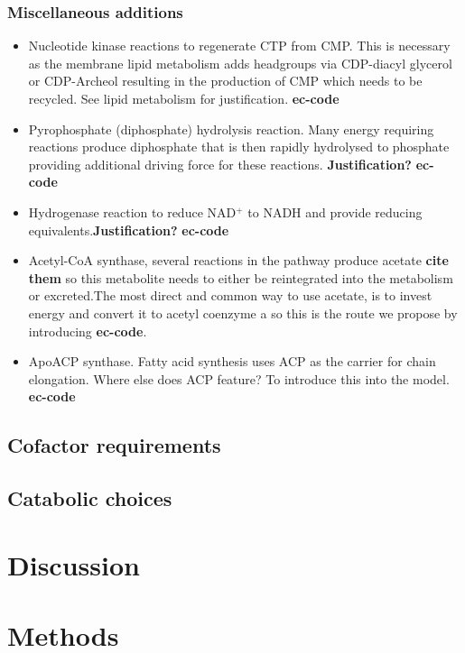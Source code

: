 \documentclass[10pt]{article}
\begin{document}
\subsubsection*{Miscellaneous additions}
\begin{itemize}
 \item Nucleotide kinase reactions to regenerate CTP from CMP. This is necessary as the membrane lipid metabolism adds headgroups via CDP-diacyl glycerol or CDP-Archeol resulting in the production of CMP which needs to be recycled. See lipid metabolism for justification. \textbf{ec-code}
 \item Pyrophosphate (diphosphate) hydrolysis reaction. Many energy requiring reactions produce diphosphate that is then rapidly hydrolysed to phosphate providing additional driving force for these reactions. \textbf{Justification?} \textbf{ec-code}
 \item Hydrogenase reaction to reduce NAD$^+$ to NADH and provide reducing equivalents.\textbf{Justification?} \textbf{ec-code}
 \item Acetyl-CoA synthase, several reactions in the pathway produce acetate \textbf{cite them} so this metabolite needs to either be reintegrated into the metabolism or excreted.The most direct and common way to use acetate, is to invest energy and convert it to acetyl coenzyme a so this is the route we propose by introducing \textbf{ec-code}.
 \item ApoACP synthase. Fatty acid synthesis uses ACP as the carrier for chain elongation. Where else does ACP feature? To introduce this into the model. \textbf{ec-code}
\end{itemize}

\subsection*{Cofactor requirements}
\subsection*{Catabolic choices}
\section*{Discussion}
\section*{Methods}
\end{document}
